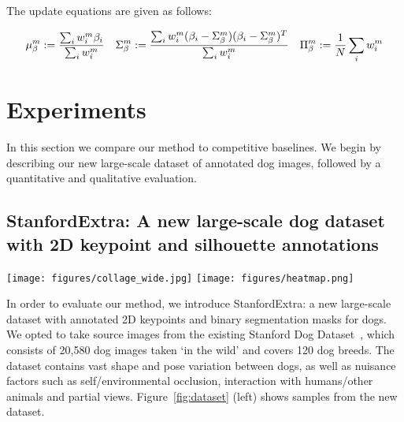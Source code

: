   The update equations are given as follows:
  
  \begin{equation}
      \mu_{\beta}^{m} := 
      \frac{
          \sum_{i}w_{i}^{m}\beta_{i}
      }
      {
          \sum_{i}w_{i}^{m}
      }
      \quad
      \Sigma_{\beta}^{m} :=
      \frac{
          \sum_{i}w_{i}^{m}
          (\beta_{i} - \Sigma_{\beta}^{m})
          (\beta_{i} - \Sigma_{\beta}^{m})^{T}
      }
      {
          \sum_{i}w_{i}^{m}
      }
      \quad
      \Pi_{\beta}^{m} :=
      \frac{1}{N}\sum_{i}{w_{i}^{m}}
  \end{equation}
  
  \section{Experiments}
  
  
  In this section we compare our method to competitive baselines. We begin by describing our new large-scale dataset of annotated dog images, followed by a quantitative and qualitative evaluation.
  
  \subsection{StanfordExtra: A new large-scale dog dataset with 2D keypoint and silhouette annotations}
  
  \begin{figure*}[t!]
      \centering
      \texttt{[image: figures/collage\_wide.jpg]}
      \texttt{[image: figures/heatmap.png]}
      \caption{\textbf{StanfordExtra example images}. \emph{Left}: outlined segmentations and labelled keypoints for a selection of StanfordExtra images. \emph{Right}: heatmap showing annotator uncertainty in per-keypoint clicking, computed over the entire dataset.}
      \label{fig:dataset}
  \end{figure*}
  
  In order to evaluate our method, we introduce StanfordExtra: a new large-scale dataset with annotated 2D keypoints and binary segmentation masks for dogs. We opted to take source images from the existing Stanford Dog Dataset~\cite{StanfordDogs}, which consists of 20,580 dog images taken `in the wild' and covers 120 dog breeds. The dataset contains vast shape and pose variation between dogs, as well as nuisance factors such as self/environmental occlusion, interaction with humans/other animals and partial views. Figure~\ref{fig:dataset} (left) shows samples from the new dataset.
  
